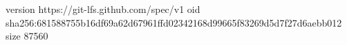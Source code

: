 version https://git-lfs.github.com/spec/v1
oid sha256:681588755b16df69a62d67961ffd02342168d99665f83269d5d7f27d6aebb012
size 87560
